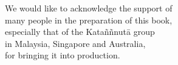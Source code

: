 
\begin{quotepage}{\linewidth}
\centering\small

We would like to acknowledge the support of\\
many people in the preparation of this book,\\
especially that of the Kataññnutā group\\
in Malaysia, Singapore and Australia,\\
for bringing it into production.

\end{quotepage}
